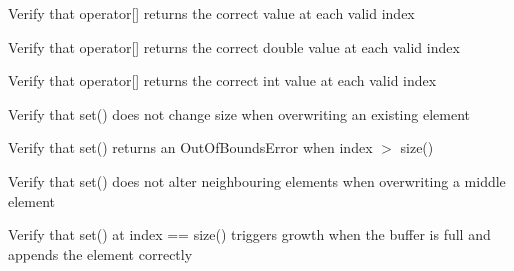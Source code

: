 \begin{DoxyRefList}
%
Verify that operator\mbox{[}\mbox{]} returns the correct  value at each valid index  
\item[Global \doxylink{test__array_8cpp_af43a5a97835219db062bba9608dc5c21}{TEST\+\_\+F} (\doxylink{classArrayInitTest}{Array\+Init\+Test}, Operator\+Bracket\+Double\+Returns\+Correct\+Values)]\label{test__test000064}%
%
Verify that operator\mbox{[}\mbox{]} returns the correct double value at each valid index  
\item[Global \doxylink{test__array_8cpp_a626e733f6075b567a4311b1727c82180}{TEST\+\_\+F} (\doxylink{classArrayInitTest}{Array\+Init\+Test}, Operator\+Bracket\+Int\+Returns\+Correct\+Values)]\label{test__test000063}%
%
Verify that operator\mbox{[}\mbox{]} returns the correct int value at each valid index  
\item[Global \doxylink{test__array_8cpp_ad1ad2eacf964eefa06b4a5c09a0decef}{TEST\+\_\+F} (\doxylink{classArrayInitTest}{Array\+Init\+Test}, Set\+Overwrite\+Does\+Not\+Change\+Size)]\label{test__test000062}%
%
Verify that set() does not change size when overwriting an existing element  
\item[Global \doxylink{test__array_8cpp_adb615c03d9c7b4340513783fc9aac3e5}{TEST\+\_\+F} (\doxylink{classArrayInitTest}{Array\+Init\+Test}, Set\+Out\+Of\+Range\+Returns\+Error)]\label{test__test000061}%
%
Verify that set() returns an Out\+Of\+Bounds\+Error when index \texorpdfstring{$>$}{>} size()  
\item[Global \doxylink{test__array_8cpp_a3ea5d7c64a9930435f3834d0baa6d77b}{TEST\+\_\+F} (\doxylink{classArrayInitTest}{Array\+Init\+Test}, Set\+Int\+Does\+Not\+Alter\+Neighbours)]\label{test__test000060}%
%
Verify that set() does not alter neighbouring elements when overwriting a middle element  
\item[Global \doxylink{test__array_8cpp_a4148134320f59269297cf74d71f43034}{TEST\+\_\+F} (\doxylink{classArrayInitTest}{Array\+Init\+Test}, Set\+Int\+At\+Size\+Triggers\+Growth)]\label{test__test000059}%
%
Verify that set() at index == size() triggers growth when the buffer is full and appends the element correctly  
\item[Global \doxylink{test__array_8cpp_acf7a2e42e0d424829f40aa1e7ee96d94}{TEST\+\_\+F} (\doxylink{classArrayInitTest}{Array\+Init\+Test}, Set\+Int\+At\+Size\+Appends\+Element)]\label{test__test000058}%

\end{DoxyRefList}
